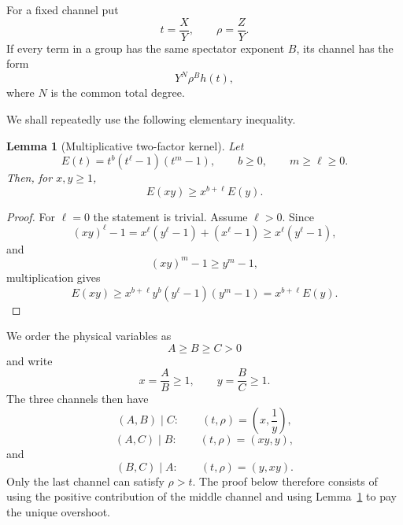 \documentclass[11pt]{article}
\newtheorem{lemma}[theorem]{Lemma}
\theoremstyle{definition}
\begin{document}
For a fixed channel put
\begin{equation*}
t=\frac XY,
\qquad
\rho=\frac ZY.
\end{equation*}
If every term in a group has the same spectator exponent \(B\), its channel has the form
\begin{equation*}
Y^N\rho^B h(t),
\end{equation*}
where \(N\) is the common total degree.

We shall repeatedly use the following elementary inequality.

\begin{lemma}[Multiplicative two-factor kernel]
\label{lem:multiplicative-kernel}
Let
\begin{equation*}
E(t)=t^b(t^\ell-1)(t^m-1),
\qquad
b\ge0,\qquad m\ge\ell\ge0.
\end{equation*}
Then, for \(x,y\ge1\),
\begin{equation*}
E(xy)\ge x^{b+\ell}E(y).
\end{equation*}
\end{lemma}

\begin{proof}
For \(\ell=0\) the statement is trivial.  Assume \(\ell>0\).  Since
\begin{equation*}
(xy)^\ell-1
=
x^\ell(y^\ell-1)+(x^\ell-1)
\ge
x^\ell(y^\ell-1),
\end{equation*}
and
\begin{equation*}
(xy)^m-1\ge y^m-1,
\end{equation*}
multiplication gives
\begin{equation*}
E(xy)
\ge
x^{b+\ell}y^b
(y^\ell-1)(y^m-1)
=
x^{b+\ell}E(y).
\end{equation*}
\end{proof}

We order the physical variables as
\begin{equation*}
A\ge B\ge C>0
\end{equation*}
and write
\begin{equation*}
x=\frac AB\ge1,
\qquad
y=\frac BC\ge1.
\end{equation*}
The three channels then have
\begin{equation*}
(A,B)\mid C:
\qquad
(t,\rho)=\left(x,\frac1y\right),
\end{equation*}
\begin{equation*}
(A,C)\mid B:
\qquad
(t,\rho)=(xy,y),
\end{equation*}
and
\begin{equation*}
(B,C)\mid A:
\qquad
(t,\rho)=(y,xy).
\end{equation*}
Only the last channel can satisfy \(\rho>t\).  The proof below therefore consists of using the positive contribution of the middle channel and using Lemma~\ref{lem:multiplicative-kernel} to pay the unique overshoot.
\end{document}

